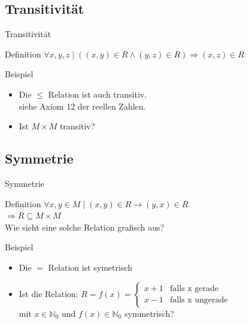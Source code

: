 	\subsection{Transitivität}
	\begin{frame}{Transitivität}
		\begin{block}{Definition}
			$\forall x,y,z \;|\; ((x,y) \in R \land (y,z) \in R) \Rightarrow (x,z) \in R$\\
		\end{block}
		
		\begin{exampleblock}{Beispiel}
			\begin{itemize}
				\item Die $\leq$ Relation ist auch transitiv.\\
				siehe Axiom 12 der reellen Zahlen.
				
				\pause
				\item Ist $M \times M$ transitiv?
			\end{itemize}
		\end{exampleblock}
	\end{frame}
	
	
	\subsection{Symmetrie}
	\begin{frame}{Symmetrie}
		\begin{block}{Definition}
			$\forall x, y \in M \; | \; (x,y) \in R \rightarrow (y,x) \in R$\\
			$\Rightarrow R \subseteq M \times M$\\
			\pause
			\vspace{10pt}
			Wie sieht eine solche Relation grafisch aus?
		\end{block}
		
		\begin{exampleblock}{Beispiel}
			\begin{itemize}
				\item Die $=$ Relation ist symetrisch\\
				
				\pause
				\item Ist die Relation: 
					$
					R = f(x) =
					\begin{cases}
					x + 1 & \text{falls x gerade}\\
					x - 1 & \text{falls x ungerade}
					\end{cases}
					$
					\\ mit $x\in \mathbb{N}_0$ und $f(x) \in \mathbb{N}_0$ symmetrisch?
			\end{itemize}
		\end{exampleblock}
	\end{frame}
	
